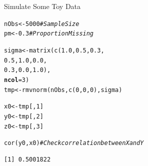 \documentclass{beamer}\usepackage[]{graphicx}\usepackage[]{color}
\makeatletter
\newcommand{\hlnum}[1]{\textcolor[rgb]{0.69,0.494,0}{#1}}%
\newcommand{\hlcom}[1]{\textcolor[rgb]{0.514,0.506,0.514}{\textit{#1}}}%
\newcommand{\hlstd}[1]{\textcolor[rgb]{0,0,0}{#1}}%
\newcommand{\hlkwb}[1]{\textcolor[rgb]{0,0.341,0.682}{#1}}%
\newcommand{\hlkwc}[1]{\textcolor[rgb]{0,0,0}{\textbf{#1}}}%
\newcommand{\hlkwd}[1]{\textcolor[rgb]{0.004,0.004,0.506}{#1}}%
\newenvironment{kframe}{%
 \def\at@end@of@kframe{}%
 \ifinner\ifhmode%
  \def\at@end@of@kframe{\end{minipage}}%
  \begin{minipage}{\columnwidth}%
 \fi\fi%
 \def\FrameCommand##1{\hskip\@totalleftmargin \hskip-\fboxsep
 \colorbox{shadecolor}{##1}\hskip-\fboxsep
     \hskip-\linewidth \hskip-\@totalleftmargin \hskip\columnwidth}%
 \MakeFramed {\advance\hsize-\width
   \@totalleftmargin\z@ \linewidth\hsize
   \@setminipage}}%
 {\par\unskip\endMakeFramed%
 \at@end@of@kframe}
\newenvironment{knitrout}{}{} %
\makeatother
\begin{document}
\begin{frame}[fragile]{Simulate Some Toy Data}

\begin{knitrout}\footnotesize
{}\color{fgcolor}\begin{kframe}
\begin{alltt}
\hlstd{nObs} \hlkwb{<-} \hlnum{5000} \hlcom{# Sample Size}
\hlstd{pm}   \hlkwb{<-} \hlnum{0.3}  \hlcom{# Proportion Missing}

\hlstd{sigma} \hlkwb{<-} \hlkwd{matrix}\hlstd{(}\hlkwd{c}\hlstd{(}\hlnum{1.0}\hlstd{,} \hlnum{0.5}\hlstd{,} \hlnum{0.3}\hlstd{,}
                  \hlnum{0.5}\hlstd{,} \hlnum{1.0}\hlstd{,} \hlnum{0.0}\hlstd{,}
                  \hlnum{0.3}\hlstd{,} \hlnum{0.0}\hlstd{,} \hlnum{1.0}\hlstd{),}
                \hlkwc{ncol} \hlstd{=} \hlnum{3}\hlstd{)}
\hlstd{tmp} \hlkwb{<-} \hlkwd{rmvnorm}\hlstd{(nObs,} \hlkwd{c}\hlstd{(}\hlnum{0}\hlstd{,} \hlnum{0}\hlstd{,} \hlnum{0}\hlstd{), sigma)}

\hlstd{x0} \hlkwb{<-} \hlstd{tmp[ ,} \hlnum{1}\hlstd{]}
\hlstd{y0} \hlkwb{<-} \hlstd{tmp[ ,} \hlnum{2}\hlstd{]}
\hlstd{z0} \hlkwb{<-} \hlstd{tmp[ ,} \hlnum{3}\hlstd{]}

\hlkwd{cor}\hlstd{(y0, x0)} \hlcom{# Check correlation between X and Y}
\end{alltt}
\begin{verbatim}
[1] 0.5001822
\end{verbatim}
\end{kframe}
\end{knitrout}

\end{frame}

\end{document}
